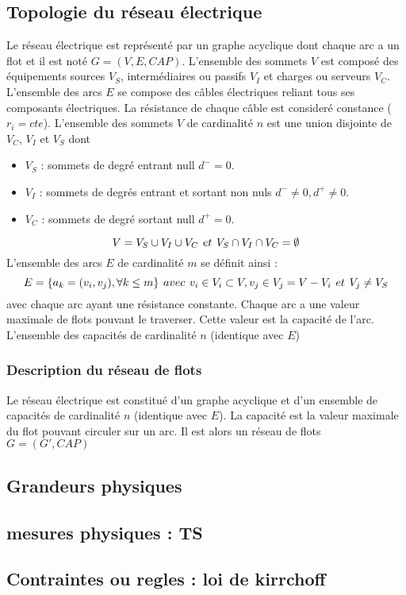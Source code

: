 \documentclass[onecolumn, 12pt]{article}
\begin{document}
\subsection{Topologie du r\'eseau \'electrique}
Le r\'eseau \'electrique est repr\'esent\'e par un graphe acyclique dont chaque arc a un flot et il est not\'e $G = (V, E, CAP)$. \newline
L'ensemble des sommets $V$ est compos\'e des \'equipements sources $V_S$, interm\'ediaires ou passifs $V_I$ et  charges ou serveurs $V_C$. L'ensemble des arcs $E$ se compose des c\^ables \'electriques reliant tous ses composants \'electriques. 
La r\'esistance de chaque c\^able est consider\'e constance ($r_i = cte $).
\newline
L'ensemble des sommets $V$ de cardinalit\'e $n$ est une union disjointe de $V_C$, $V_I$ et $V_S$ dont 
\begin{itemize}
	\item $V_S$ : sommets de degr\'e entrant null $d^- = 0$.
	\item $V_I$ : sommets de degr\'es entrant et sortant non nuls $d^- \ne 0, d^+ \ne 0$.  
	\item $V_C$ : sommets de degr\'e sortant null  $d^+ = 0$.
\end{itemize}
$$ V = V_S \cup V_I \cup V_C \hspace{0.4 em} et \hspace{0.4 em} V_S \cap V_I \cap V_C = \emptyset $$
L'ensemble des arcs $E$ de cardinalit\'e $m$ se d\'efinit ainsi :
\begin{equation}
 E = \{a_k = (v_i, v_j), \forall k \le m \} \hspace{0.4 em } avec \hspace{0.4 em} v_i \in V_i \subset V, v_j \in V_j =  V - V_i \hspace{0.4 em} et \hspace{0.4 em}  V_j \ne V_S 
\end{equation}
avec chaque arc ayant une r\'esistance constante. 
\newline
Chaque arc a une valeur maximale de flots pouvant le traverser. Cette valeur est la capacit\'e de l'arc.
L'ensemble des capacit\'es de cardinalit\'e $n$ (identique avec $E$) 

\subsubsection{Description du r\'eseau de flots}
Le r\'eseau \'electrique est constitu\'e d'un graphe acyclique et d'un ensemble de capacit\'es de cardinalit\'e $n$ (identique avec $E$). La capacit\'e est la valeur maximale du flot pouvant circuler sur un arc. Il est alors un r\'eseau de flots  $G = ( G', CAP)$

\subsection{Grandeurs physiques}
\subsection{mesures physiques : TS}

\subsection{Contraintes ou regles : loi de kirrchoff}
\end{document}
